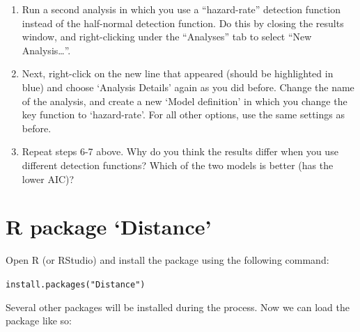 \documentclass[12pt]{article}\usepackage[]{graphicx}\usepackage[]{color}
\makeatletter
\newcommand{\hlstr}[1]{\textcolor[rgb]{0.749,0.012,0.012}{#1}}%
\newcommand{\hlstd}[1]{\textcolor[rgb]{0,0,0}{#1}}%
\newcommand{\hlkwd}[1]{\textcolor[rgb]{0.004,0.004,0.506}{#1}}%
\newenvironment{kframe}{%
 \def\at@end@of@kframe{}%
 \ifinner\ifhmode%
  \def\at@end@of@kframe{\end{minipage}}%
  \begin{minipage}{\columnwidth}%
 \fi\fi%
 \def\FrameCommand##1{\hskip\@totalleftmargin \hskip-\fboxsep
 \colorbox{shadecolor}{##1}\hskip-\fboxsep
     \hskip-\linewidth \hskip-\@totalleftmargin \hskip\columnwidth}%
 \MakeFramed {\advance\hsize-\width
   \@totalleftmargin\z@ \linewidth\hsize
   \@setminipage}}%
 {\par\unskip\endMakeFramed%
 \at@end@of@kframe}
\newenvironment{knitrout}{}{} %
\makeatother
\begin{document}
\begin{enumerate}
  \item Run a second analysis in which you use a ``hazard-rate''
    detection function instead of the half-normal detection
    function. Do this by closing the results window, and
    right-clicking under the ``Analyses'' tab to select ``New Analysis\dots''.  
  \item Next, right-click on the new line that appeared (should be
    highlighted in blue) and choose `Analysis Details' again as you
    did before. Change the name of the analysis, and create a new
    `Model definition' in which you change the key function to
    `hazard-rate'. For all other options, use the same settings as
    before.   
  \item Repeat steps 6-7 above. Why do you think the results differ
    when you use different detection functions? Which of the two
    models is better (has the lower AIC)?  
\end{enumerate}


\clearpage


\section*{R package `Distance'}

Open R (or RStudio) and install the package using the following
command: 

\begin{knitrout}
\color{fgcolor}\begin{kframe}
\begin{alltt}
\hlkwd{install.packages}\hlstd{(}\hlstr{"Distance"}\hlstd{)}
\end{alltt}
\end{kframe}
\end{knitrout}

Several other packages will be installed during the process. Now we
can load the package like so: 
\end{document}

